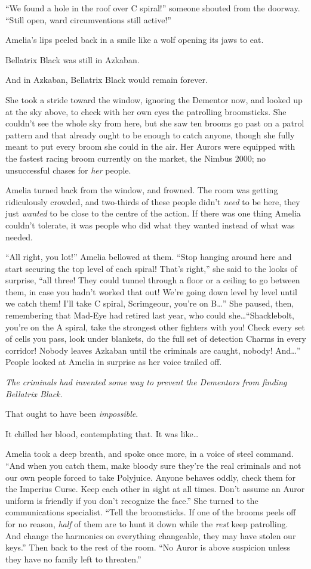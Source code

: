 “We found a hole in the roof over C spiral!” someone shouted from the doorway. “Still open, ward circumventions still active!”

Amelia’s lips peeled back in a smile like a wolf opening its jaws to eat.

Bellatrix Black was still in Azkaban.

And in Azkaban, Bellatrix Black would remain forever.

She took a stride toward the window, ignoring the Dementor now, and looked up at the sky above, to check with her own eyes the patrolling broomsticks. She couldn’t see the whole sky from here, but she saw ten brooms go past on a patrol pattern and that already ought to be enough to catch anyone, though she fully meant to put every broom she could in the air. Her Aurors were equipped with the fastest racing broom currently on the market, the Nimbus 2000; no unsuccessful chases for \emph{her} people.

Amelia turned back from the window, and frowned. The room was getting ridiculously crowded, and two-thirds of these people didn’t \emph{need} to be here, they just \emph{wanted} to be close to the centre of the action. If there was one thing Amelia couldn’t tolerate, it was people who did what they wanted instead of what was needed.

“All right, you lot!” Amelia bellowed at them. “Stop hanging around here and start securing the top level of each spiral! That’s right,” she said to the looks of surprise, “all three! They could tunnel through a floor or a ceiling to go between them, in case you hadn’t worked that out! We’re going down level by level until we catch them! I’ll take C spiral, Scrimgeour, you’re on B…” She paused, then, remembering that Mad-Eye had retired last year, who could she…“Shacklebolt, you’re on the A spiral, take the strongest other fighters with you! Check every set of cells you pass, look under blankets, do the full set of detection Charms in every corridor! Nobody leaves Azkaban until the criminals are caught, nobody! And…” People looked at Amelia in surprise as her voice trailed off.

\emph{The criminals had invented some way to prevent the Dementors from finding Bellatrix Black.}

That ought to have been \emph{impossible}.

It chilled her blood, contemplating that. It was like…

Amelia took a deep breath, and spoke once more, in a voice of steel command. “And when you catch them, make bloody sure they’re the real criminals and not our own people forced to take Polyjuice. Anyone behaves oddly, check them for the Imperius Curse. Keep each other in sight at all times. Don’t assume an Auror uniform is friendly if you don’t recognize the face.” She turned to the communications specialist. “Tell the broomsticks. If one of the brooms peels off for no reason, \emph{half} of them are to hunt it down while the \emph{rest} keep patrolling. And change the harmonics on everything changeable, they may have stolen our keys.” Then back to the rest of the room. “No Auror is above suspicion unless they have no family left to threaten.”

